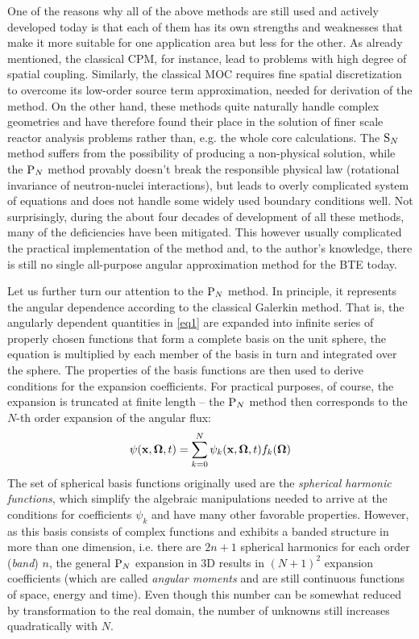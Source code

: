 One of the reasons why all of the above methods are still used and actively developed today is that each of them has its own strengths and weaknesses that make it more suitable for one application area but less for the other. As already mentioned, the classical CPM, for instance, lead to problems with high degree of spatial coupling. Similarly, the classical MOC requires fine spatial discretization to overcome its low-order source term approximation, needed for derivation of the method. On the other hand, these methods quite naturally handle complex geometries and have therefore found their place in the solution of finer scale reactor analysis problems rather than, e.g. the whole core calculations. The $\mathrm{S}_{N}$ method suffers from the possibility of producing a non-physical solution, while the $\mathrm{P}_{N}$ method provably doesn't break the responsible physical law (rotational invariance of neutron-nuclei interactions), but leads to overly complicated system of equations and does not handle some widely used boundary conditions well. Not surprisingly, during the about four decades of development of all these methods, many of the deficiencies have been mitigated. This however usually complicated the practical implementation of the method and, to the author's knowledge, there is still no single all-purpose angular approximation method for the BTE today. 

Let us further turn our attention to the $\mathrm{P}_{N}$ method. In principle, it represents the angular dependence according to the classical Galerkin method. That is, the angularly dependent quantities in \eqref{eq1} are expanded into infinite series of properly chosen functions that form a complete basis on the unit sphere, the equation is multiplied by each member of the basis in turn and integrated over the sphere. The properties of the basis functions are then used to derive conditions for the expansion coefficients. For practical purposes, of course, the expansion is truncated at finite length -- the $\mathrm{P}_{N}$ method then corresponds to the $N$-th order expansion of the angular flux:
$$
  \psi(\mathbf{x},\mathbf{\Omega},t) = \sum_{k=0}^N \psi_k(\mathbf{x},\mathbf{\Omega},t) f_k(\mathbf{\Omega})
$$
The set of spherical basis functions originally used are the \textit{spherical harmonic functions}, which simplify the algebraic manipulations needed to arrive at the conditions for coefficients $\psi_k$ and have many other favorable properties. However, as this basis consists of complex functions and exhibits a banded structure in more than one dimension, i.e. there are $2n + 1$ spherical harmonics for each order (\textit{band}) $n$, the general $\mathrm{P}_{N}$ expansion in 3D results in $(N+1)^2$ expansion coefficients (which are called \textit{angular moments} and are still continuous functions of space, energy and time). Even though this number can be somewhat reduced by transformation to the real domain, the number of unknowns still increases quadratically with $N$.

